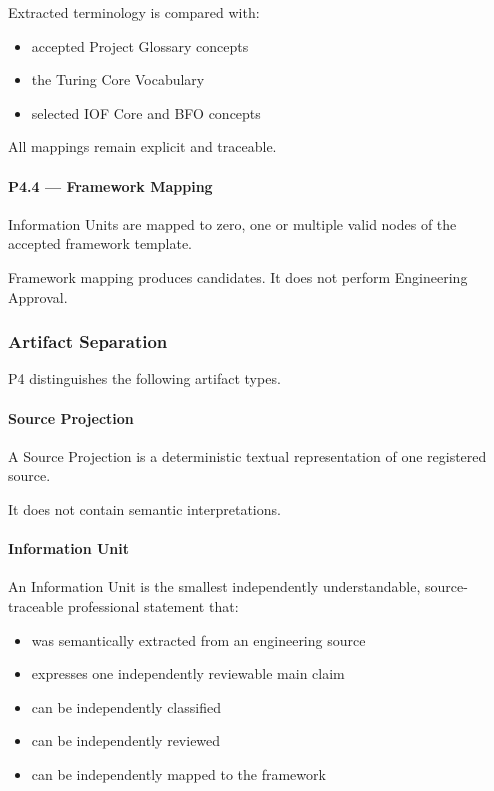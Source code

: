 Extracted terminology is compared with:

\begin{itemize}
\tightlist
\item
  accepted Project Glossary concepts
\item
  the Turing Core Vocabulary
\item
  selected IOF Core and BFO concepts
\end{itemize}

All mappings remain explicit and traceable.

\hypertarget{p44--framework-mapping}{%
\paragraph{P4.4 --- Framework Mapping}\label{p44--framework-mapping}}

Information Units are mapped to zero, one or multiple valid nodes of the accepted framework template.

Framework mapping produces candidates. It does not perform Engineering Approval.

\hypertarget{artifact-separation}{%
\subsubsection{Artifact Separation}\label{artifact-separation}}

P4 distinguishes the following artifact types.

\hypertarget{source-projection}{%
\paragraph{Source Projection}\label{source-projection}}

A Source Projection is a deterministic textual representation of one registered source.

It does not contain semantic interpretations.

\hypertarget{information-unit}{%
\paragraph{Information Unit}\label{information-unit}}

An Information Unit is the smallest independently understandable, source-traceable professional statement that:

\begin{itemize}
\tightlist
\item
  was semantically extracted from an engineering source
\item
  expresses one independently reviewable main claim
\item
  can be independently classified
\item
  can be independently reviewed
\item
  can be independently mapped to the framework
\end{itemize}

